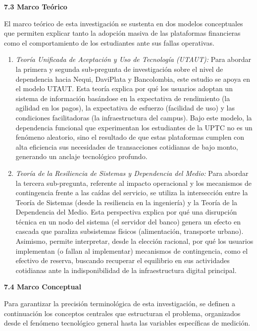 \vspace{0.4cm}
\noindent\textbf{\large 7.3 Marco Teórico}\par\vspace{0.2cm}
El marco teórico de esta investigación se sustenta en dos modelos conceptuales que permiten explicar tanto la adopción masiva de las plataformas financieras como el comportamiento de los estudiantes ante sus fallas operativas.

\begin{enumerate}
    \item \textit{Teoría Unificada de Aceptación y Uso de Tecnología (UTAUT):} Para abordar la primera y segunda sub-pregunta de investigación sobre el nivel de dependencia hacia Nequi, DaviPlata y Bancolombia, este estudio se apoya en el modelo UTAUT. Esta teoría explica por qué los usuarios adoptan un sistema de información basándose en la expectativa de rendimiento (la agilidad en los pagos), la expectativa de esfuerzo (facilidad de uso) y las condiciones facilitadoras (la infraestructura del campus). Bajo este modelo, la dependencia funcional que experimentan los estudiantes de la UPTC no es un fenómeno aleatorio, sino el resultado de que estas plataformas cumplen con alta eficiencia sus necesidades de transacciones cotidianas de bajo monto, generando un anclaje tecnológico profundo.

    \item \textit{Teoría de la Resiliencia de Sistemas y Dependencia del Medio:} Para abordar la tercera sub-pregunta, referente al impacto operacional y los mecanismos de contingencia frente a las caídas del servicio, se utiliza la intersección entre la Teoría de Sistemas (desde la resiliencia en la ingeniería) y la Teoría de la Dependencia del Medio. Esta perspectiva explica por qué una disrupción técnica en un nodo del sistema (el servidor del banco) genera un efecto en cascada que paraliza subsistemas físicos (alimentación, transporte urbano). Asimismo, permite interpretar, desde la elección racional, por qué los usuarios implementan (o fallan al implementar) mecanismos de contingencia, como el efectivo de reserva, buscando recuperar el equilibrio en sus actividades cotidianas ante la indisponibilidad de la infraestructura digital principal.
\end{enumerate}

\vspace{0.4cm}
\noindent\textbf{\large 7.4 Marco Conceptual}\par\vspace{0.2cm}
Para garantizar la precisión terminológica de esta investigación, se definen a continuación los conceptos centrales que estructuran el problema, organizados desde el fenómeno tecnológico general hasta las variables específicas de medición.

